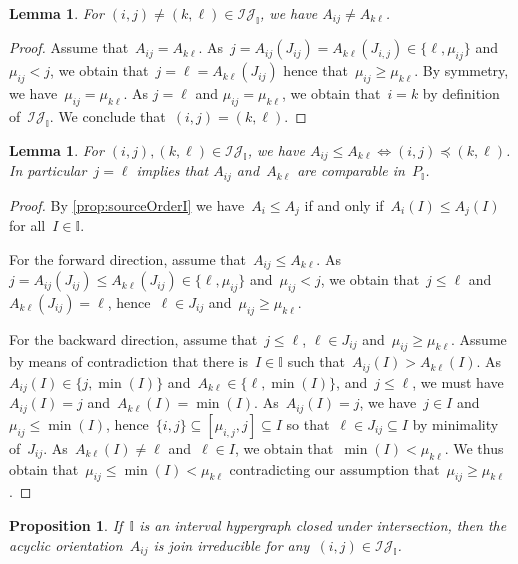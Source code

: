 \documentclass{amsart}
\newtheorem{proposition}[theorem]{Proposition}
\newtheorem{lemma}[theorem]{Lemma}
\theoremstyle{definition}
\newcommand{\cal}[1]{\mathcal{#1}} %
\newcommand{\II}{\mathbb I} %
\newcommand{\cIJ}{\cal{IJ}} %
\begin{document}
\begin{lemma}
\label{lem:distinctIrreducibles2}
For $(i,j) \ne (k,\ell) \in \cIJ_\II$, we have $A_{ij} \ne A_{k\ell}$.
\end{lemma}

\begin{proof}
Assume that~$A_{ij} = A_{k\ell}$.
As~$j = A_{ij}(J_{ij}) = A_{k\ell}(J_{i,j}) \in \{\ell, \mu_{ij}\}$ and~$\mu_{ij} < j$, we obtain that~$j = \ell = A_{k\ell}(J_{ij})$ hence that~$\mu_{ij} \ge \mu_{k\ell}$.
By symmetry, we have~$\mu_{ij} = \mu_{k\ell}$.
As $j = \ell$ and $\mu_{ij} = \mu_{k\ell}$, we obtain that~$i = k$ by definition of~$\cIJ_\II$.
We conclude that~$(i,j) = (k,\ell)$.
\end{proof}

\begin{lemma}
\label{lem:irrorder2}
For $(i,j), (k,\ell) \in \cIJ_\II$, we have $A_{ij} \le A_{k\ell} \iff (i,j) \preccurlyeq (k,\ell)$.
In particular~$j = \ell$ implies that $A_{ij}$ and~$A_{k\ell}$ are comparable in~$P_\II$.
\end{lemma}

\begin{proof}
By \cref{prop:sourceOrderI} we have~$A_i \le A_j$ if and only if~$A_i(I) \le A_j(I)$ for all~$I \in \II$.

For the forward direction, assume that~$A_{ij} \le A_{k\ell}$.
As~$j = A_{ij}(J_{ij}) \le A_{k\ell}(J_{ij}) \in \{\ell, \mu_{ij}\}$ and~$\mu_{ij} < j$, we obtain that~$j \le \ell$ and~$A_{k\ell}(J_{ij}) = \ell$, hence~$\ell \in J_{ij}$ and~$\mu_{ij} \ge \mu_{k\ell}$.

For the backward direction, assume that~$j \le \ell$, $\ell \in J_{ij}$ and~$\mu_{ij} \ge \mu_{k\ell}$.
Assume by means of contradiction that there is~$I \in \II$ such that~$A_{ij}(I) > A_{k\ell}(I)$.
As $A_{ij}(I) \in \{j, \min(I)\}$ and~$A_{k\ell} \in \{\ell, \min(I)\}$, and~$j \le \ell$, we must have~$A_{ij}(I) = j$ and~$A_{k\ell}(I) = \min(I)$.
As~$A_{ij}(I) = j$, we have~$j \in I$ and~$\mu_{ij} \le \min(I)$, hence~$\{i,j\} \subseteq [\mu_{i,j},j] \subseteq I$ so that~$\ell \in J_{ij} \subseteq I$ by minimality of~$J_{ij}$.
As~$A_{k\ell}(I) \ne \ell$ and~$\ell \in I$, we obtain that~$\min(I) < \mu_{k\ell}$.
We thus obtain that~$\mu_{ij} \le \min(I) < \mu_{k\ell}$ contradicting our assumption that~$\mu_{ij} \ge \mu_{k\ell}$.
\end{proof}

\begin{proposition}
\label{prop:AijJoinIrreducible}
If~$\II$ is an interval hypergraph closed under intersection, then the acyclic orientation~$A_{ij}$ is join irreducible for any~$(i,j) \in \cIJ_\II$.
\end{proposition}
\end{document}
